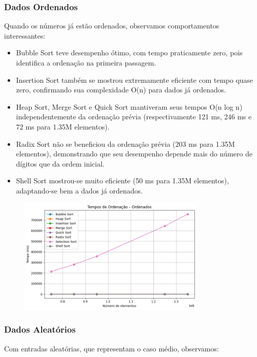 \documentclass[a4paper, 12pt]{article}
\begin{document}
        \subsubsection{Dados Ordenados}
            Quando os números já estão ordenados, observamos comportamentos interessantes:

            \begin{itemize}
                \item Bubble Sort teve desempenho ótimo, com tempo praticamente zero, pois identifica a ordenação na primeira passagem.
                \item Insertion Sort também se mostrou extremamente eficiente com tempo quase zero, confirmando sua complexidade O(n) para dados já ordenados.
                \item Heap Sort, Merge Sort e Quick Sort mantiveram seus tempos O(n log n) independentemente da ordenação prévia (respectivamente 121 ms, 246 ms e 72 ms para 1.35M elementos).
                \item Radix Sort não se beneficiou da ordenação prévia (203 ms para 1.35M elementos), demonstrando que seu desempenho depende mais do número de dígitos que da ordem inicial.
                \item Shell Sort mostrou-se muito eficiente (50 ms para 1.35M elementos), adaptando-se bem a dados já ordenados.
            \end{itemize}

            \begin{figure}[ht]
                \centering
                \includegraphics[width=0.8\textwidth]{images/ordenados.png}
            \end{figure}

        \subsubsection{Dados Aleatórios}
            Com entradas aleatórias, que representam o caso médio, observamos:
\end{document}
